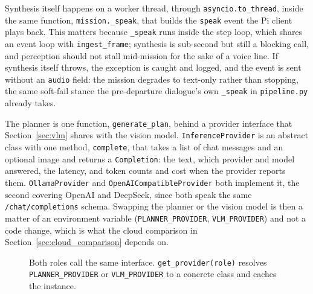 Synthesis itself happens on a worker thread, through
\texttt{asyncio.to\_thread}, inside the same function,
\texttt{mission.\_speak}, that builds the \texttt{speak} event the Pi client
plays back. This matters because \texttt{\_speak} runs inside the step loop,
which shares an event loop with \texttt{ingest\_frame}; synthesis is sub-second
but still a blocking call, and perception should not stall mid-mission for the
sake of a voice line. If synthesis itself throws, the exception is caught and
logged, and the event is sent without an \texttt{audio} field: the mission
degrades to text-only rather than stopping, the same soft-fail stance the
pre-departure dialogue's own \texttt{\_speak} in \texttt{pipeline.py} already
takes.

\label{sec:inference}

\label{sec:planner}

The planner is one function, \texttt{generate\_plan}, behind a provider interface
that Section~\ref{sec:vlm} shares with the vision model. \texttt{InferenceProvider}
is an abstract class with one method, \texttt{complete}, that takes a list of
chat messages and an optional image and returns a \texttt{Completion}: the text,
which provider and model answered, the latency, and token counts and cost when
the provider reports them. \texttt{OllamaProvider} and
\texttt{OpenAICompatibleProvider} both implement it, the second covering OpenAI
and DeepSeek, since both speak the same \texttt{/chat/completions} schema.
Swapping the planner or the vision model is then a matter of an environment
variable (\texttt{PLANNER\_PROVIDER}, \texttt{VLM\_PROVIDER}) and not a code
change, which is what the cloud comparison in
Section~\ref{sec:cloud_comparison} depends on.

\begin{figure}[htbp]
  \centering
  \caption{Both roles call the same interface. \texttt{get\_provider(role)} resolves \texttt{PLANNER\_PROVIDER} or \texttt{VLM\_PROVIDER} to a concrete class and caches the instance.}
  \label{fig:providers}
\end{figure}

